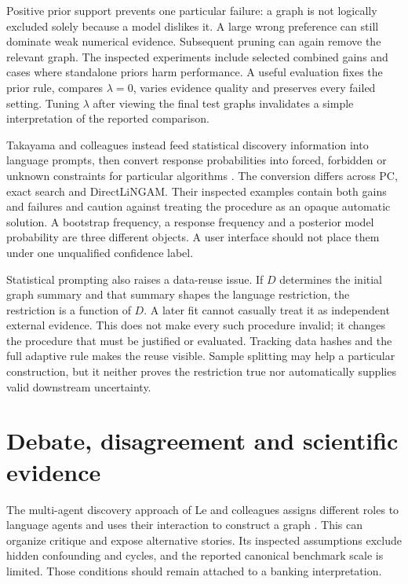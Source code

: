 Positive prior support prevents one particular failure: a graph is not
logically excluded solely because a model dislikes it. A large wrong
preference can still dominate weak numerical evidence. Subsequent pruning can
again remove the relevant graph. The inspected experiments include selected
combined gains and cases where standalone priors harm performance. A useful
evaluation fixes the prior rule, compares $\lambda=0$, varies evidence quality
and preserves every failed setting. Tuning $\lambda$ after viewing the final
test graphs invalidates a simple interpretation of the reported comparison.

Takayama and colleagues instead feed statistical discovery information into
language prompts, then convert response probabilities into forced, forbidden
or unknown constraints for particular algorithms
\cite{v12_la_2402_01454}. The conversion differs across PC, exact search and
DirectLiNGAM. Their inspected examples contain both gains and failures and
caution against treating the procedure as an opaque automatic solution.
A bootstrap frequency, a response frequency and a posterior model probability
are three different objects. A user interface should not place them under one
unqualified confidence label.

Statistical prompting also raises a data-reuse issue. If $D$ determines the
initial graph summary and that summary shapes the language restriction, the
restriction is a function of $D$. A later fit cannot casually treat it as
independent external evidence. This does not make every such procedure
invalid; it changes the procedure that must be justified or evaluated.
Tracking data hashes and the full adaptive rule makes the reuse visible.
Sample splitting may help a particular construction, but it neither proves the
restriction true nor automatically supplies valid downstream uncertainty.

\section{Debate, disagreement and scientific evidence}

The multi-agent discovery approach of Le and colleagues assigns different
roles to language agents and uses their interaction to construct a graph
\cite{v12_la_2407_15073}. This can organize critique and expose alternative
stories. Its inspected assumptions exclude hidden confounding and cycles, and
the reported canonical benchmark scale is limited. Those conditions should
remain attached to a banking interpretation.

